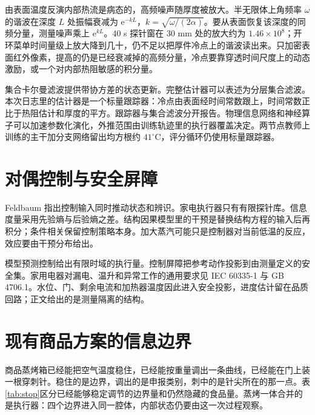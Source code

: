由表面温度反演内部热流是病态的，高频噪声随厚度被放大\cite{ozisik2000}。半无限体上角频率 \(\omega\) 的谐波在深度 \(L\) 处振幅衰减为 \(\mathrm{e}^{-kL}\)，\(k=\sqrt{\omega/(2\alpha)}\)。要从表面恢复该深度的同频分量，测量噪声乘上 \(\mathrm{e}^{kL}\)。40 s 探针窗在 30 mm 处的放大约为 \(1.46\times 10^{8}\)；开环菜单时间量级上放大降到几十，仍不足以把厚件冷点上的谐波读出来。只加密表面红外像素，提高的仍是已经衰减掉的高频分量，冷点要靠穿透时间尺度上的动态激励，或一个对内部热阻敏感的积分量。

集合卡尔曼滤波提供带协方差的状态更新\cite{evensen2003}。完整估计器可以表述为分层集合滤波。本次日志里的估计器是一个标量跟踪器：冷点由表面经时间常数跟上，时间常数正比于热阻估计和厚度的平方。跟踪器与集合滤波分开报告。物理信息网络和神经算子可以加速参数化演化\cite{raissi2019,li2021fno,lu2021deeponet}，外推范围由训练轨迹里的执行器覆盖决定。两节点教师上训练的主干加分支网络留出均方根约 \(41^\circ\mathrm{C}\)，评分循环仍使用标量跟踪器。

\section{对偶控制与安全屏障}

Feldbaum 指出控制输入同时推动状态和辨识\cite{feldbaum1965}。家电执行器只有有限探针库。信息度量采用先验熵与后验熵之差\cite{lindley1956}。结构因果模型里的干预是替换结构方程的输入后再积分；条件相关保留控制策略本身\cite{pearl2009}。加大蒸汽可能只是控制器对当前低温的反应，效应要由干预分布给出。

模型预测控制给出有限时域的执行量\cite{rawlings2017}。控制屏障把参考动作投影到由测量定义的安全集\cite{ames2017cbf}。家用电器对漏电、温升和异常工作的通用要求见 IEC 60335-1 与 GB 4706.1\cite{iec60335,gb4706}。水位、门、剩余电流和加热器温度因此进入安全投影，进度估计留在品质回路；正文给出的是测量隔离的结构。

\section{现有商品方案的信息边界}

商品蒸烤箱已经能把空气温度稳住，已经能按重量调出一条曲线，已经能在门上装一根穿刺针。稳住的是边界，调出的是申报类别，刺中的是针尖所在的那一点。表\ref{tab:stop}区分已经能够稳定调节的边界量和仍然隐藏的食品量。蒸烤一体合并的是执行器：四个边界进入同一腔体，内部状态仍要由这一次过程观察。

